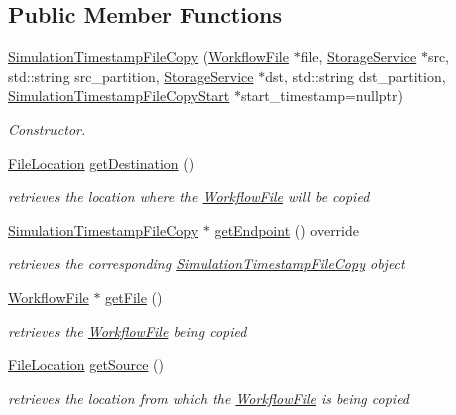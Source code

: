 \subsection*{Public Member Functions}
\begin{DoxyCompactItemize}
\item 
\hyperlink{classwrench_1_1_simulation_timestamp_file_copy_a76fca039f3cf0f76768d13c437af2a14}{Simulation\+Timestamp\+File\+Copy} (\hyperlink{classwrench_1_1_workflow_file}{Workflow\+File} $\ast$file, \hyperlink{classwrench_1_1_storage_service}{Storage\+Service} $\ast$src, std\+::string src\+\_\+partition, \hyperlink{classwrench_1_1_storage_service}{Storage\+Service} $\ast$dst, std\+::string dst\+\_\+partition, \hyperlink{classwrench_1_1_simulation_timestamp_file_copy_start}{Simulation\+Timestamp\+File\+Copy\+Start} $\ast$start\+\_\+timestamp=nullptr)
\begin{DoxyCompactList}\small\item\em Constructor. \end{DoxyCompactList}\item 
\hyperlink{structwrench_1_1_simulation_timestamp_file_copy_1_1_file_location}{File\+Location} \hyperlink{classwrench_1_1_simulation_timestamp_file_copy_a18c0be71ae79818fe8d0300b08bb2238}{get\+Destination} ()
\begin{DoxyCompactList}\small\item\em retrieves the location where the \hyperlink{classwrench_1_1_workflow_file}{Workflow\+File} will be copied \end{DoxyCompactList}\item 
\hyperlink{classwrench_1_1_simulation_timestamp_file_copy}{Simulation\+Timestamp\+File\+Copy} $\ast$ \hyperlink{classwrench_1_1_simulation_timestamp_file_copy_a2cd940b53a294459ebcab5bce823c9a0}{get\+Endpoint} () override
\begin{DoxyCompactList}\small\item\em retrieves the corresponding \hyperlink{classwrench_1_1_simulation_timestamp_file_copy}{Simulation\+Timestamp\+File\+Copy} object \end{DoxyCompactList}\item 
\hyperlink{classwrench_1_1_workflow_file}{Workflow\+File} $\ast$ \hyperlink{classwrench_1_1_simulation_timestamp_file_copy_a20275ad1b9f85099fed946e656420e1c}{get\+File} ()
\begin{DoxyCompactList}\small\item\em retrieves the \hyperlink{classwrench_1_1_workflow_file}{Workflow\+File} being copied \end{DoxyCompactList}\item 
\hyperlink{structwrench_1_1_simulation_timestamp_file_copy_1_1_file_location}{File\+Location} \hyperlink{classwrench_1_1_simulation_timestamp_file_copy_abde1808a7023d864ad0419cb9451d789}{get\+Source} ()
\begin{DoxyCompactList}\small\item\em retrieves the location from which the \hyperlink{classwrench_1_1_workflow_file}{Workflow\+File} is being copied \end{DoxyCompactList}\end{DoxyCompactItemize}
